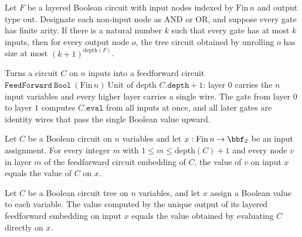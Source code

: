 \begin{theorem}
\label{BoolCircuit.LayeredCircuit.toTreeCircuit_size_le}
\leanok
{}
Let $F$ be a layered Boolean circuit with input nodes indexed by $\mathrm{Fin}\,n$ and
output type $\mathrm{out}$. Designate each non-input node as AND or OR, and suppose
every gate has finite arity. If there is a natural number $k$ such that every gate has
at most $k$ inputs, then for every output node $o$, the tree circuit obtained by
unrolling $o$ has size at most $(k+1)^{\mathrm{depth}(F)}$.
\end{theorem}

\begin{definition}
\label{BoolCircuit.TreeCircuit.toLayeredWrapper}
\leanok
{}
Turns a circuit $C$ on $n$ inputs into a feedforward circuit
$\texttt{FeedForward}\ \texttt{Bool}\ (\mathrm{Fin}\,n)\ \mathrm{Unit}$ of depth
$C.\texttt{depth} + 1$: layer $0$ carries the $n$ input variables and every higher
layer carries a single wire. The gate from layer $0$ to layer $1$ computes
$C.\texttt{eval}$ from all inputs at once, and all later gates are identity wires
that pass the single Boolean value upward.
\end{definition}

\begin{theorem}
\label{BoolCircuit.TreeCircuit.toLayeredWrapper_evalNode_const}
\leanok
{}
Let $C$ be a Boolean circuit on $n$ variables and let $x : \mathrm{Fin}\,n \to \bbf_2$
be an input assignment. For every integer $m$ with $1 \le m \le \mathrm{depth}(C)+1$ and
every node $v$ in layer $m$ of the feedforward circuit embedding of $C$, the value of
$v$ on input $x$ equals the value of $C$ on $x$.
\end{theorem}

\begin{theorem}
\label{BoolCircuit.TreeCircuit.toLayeredWrapper_eval}
\leanok
{}
Let $C$ be a Boolean circuit tree on $n$ variables, and let $x$ assign a Boolean value
to each variable. The value computed by the unique output of its layered feedforward
embedding on input $x$ equals the value obtained by evaluating $C$ directly on $x$.
\end{theorem}

